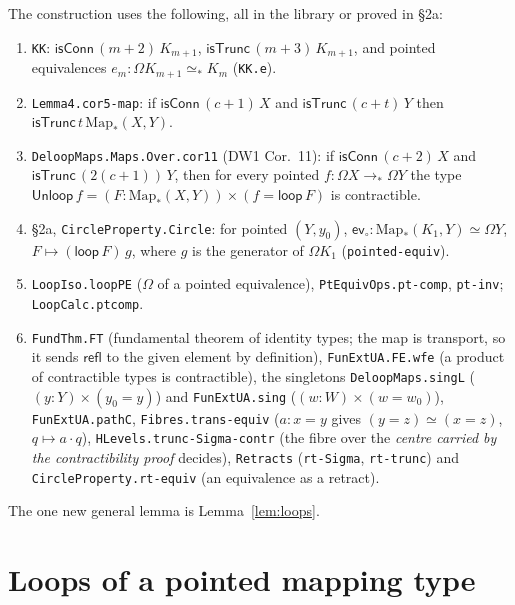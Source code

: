 \documentclass[11pt]{amsart}
\theoremstyle{definition}
\theoremstyle{remark}
\newcommand{\Om}{\Omega}
\newcommand{\Map}{\mathrm{Map}_*}
\newcommand{\code}[1]{\texttt{#1}}
\newcommand{\cT}{\mathsf{isTrunc}}
\newcommand{\cC}{\mathsf{isConn}}
\newcommand{\cc}{\cdot}
\newcommand{\refl}{\mathsf{refl}}
\newcommand{\ev}{\mathsf{ev}}
\newcommand{\lp}{\mathsf{loop}}
\begin{document}
The construction uses the following, all in the library or proved in \S2a:
\begin{enumerate}
\item[(I1)] \code{KK}: $\cC\,(m+2)\,K_{m+1}$, $\cT\,(m+3)\,K_{m+1}$,
  and pointed equivalences $e_m:\Om K_{m+1}\simeq_*K_m$ (\code{KK.e}).
\item[(I2)] \code{Lemma4.cor5-map}: if $\cC\,(c+1)\,X$ and
  $\cT\,(c+t)\,Y$ then $\cT\,t\,\Map(X,Y)$.
\item[(I3)] \code{DeloopMaps.Maps.Over.cor11} (DW1 Cor.~11): if
  $\cC\,(c+2)\,X$ and $\cT\,(2(c+1))\,Y$, then for every pointed
  $f:\Om X\to_*\Om Y$ the type
  $\mathsf{Unloop}\,f=(F:\Map(X,Y))\times(f=\lp\,F)$ is contractible.
\item[(I4)] \S2a, \code{CircleProperty.Circle}: for pointed $(Y,y_0)$,
  $\ev_\circ:\Map(K_1,Y)\simeq\Om Y$, $F\mapsto(\lp\,F)\,g$, where $g$ is
  the generator of $\Om K_1$ (\code{pointed-equiv}).
\item[(I5)] \code{LoopIso.loopPE} ($\Om$ of a pointed equivalence),
  \code{PtEquivOps.pt-comp}, \code{pt-inv}; \code{LoopCalc.ptcomp}.
\item[(I6)] \code{FundThm.FT} (fundamental theorem of identity types;
  the map is transport, so it sends $\refl$ to the given element by
  definition), \code{FunExtUA.FE.wfe} (a product of contractible types is
  contractible), the singletons \code{DeloopMaps.singL} ($(y:Y)\times(y_0=y)$)
  and \code{FunExtUA.sing} ($(w:W)\times(w=w_0)$), \code{FunExtUA.pathC},
  \code{Fibres.trans-equiv} ($a:x=y$ gives $(y=z)\simeq(x=z)$, $q\mapsto a\cc q$),
  \code{HLevels.trunc-Sigma-contr} (the fibre over the \emph{centre carried
  by the contractibility proof} decides), \code{Retracts} (\code{rt-Sigma},
  \code{rt-trunc}) and \code{CircleProperty.rt-equiv} (an equivalence as a
  retract).
\end{enumerate}
The one new general lemma is Lemma~\ref{lem:loops}.

\section{Loops of a pointed mapping type}
\end{document}
